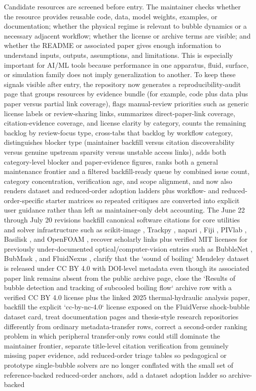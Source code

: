 \documentclass[11pt]{article}
\begin{document}
Candidate resources are screened before entry. The maintainer checks whether the resource provides reusable code, data, model weights, examples, or documentation; whether the physical regime is relevant to bubble dynamics or a necessary adjacent workflow; whether the license or archive terms are visible; and whether the README or associated paper gives enough information to understand inputs, outputs, assumptions, and limitations. This is especially important for AI/ML tools because performance in one apparatus, fluid, surface, or simulation family does not imply generalization to another. To keep these signals visible after entry, the repository now generates a reproducibility-audit page that groups resources by evidence bundle (for example, code plus data plus paper versus partial link coverage), flags manual-review priorities such as generic license labels or review-sharing links, summarizes direct-paper-link coverage, citation-evidence coverage, and license clarity by category, counts the remaining backlog by review-focus type, cross-tabs that backlog by workflow category, distinguishes blocker type (maintainer backfill versus citation discoverability versus genuine upstream sparsity versus unstable access links), adds both category-level blocker and paper-evidence figures, ranks both a general maintenance frontier and a filtered backfill-ready queue by combined issue count, category concentration, verification age, and scope alignment, and now also renders dataset and reduced-order adoption ladders plus workflow- and reduced-order-specific starter matrices so repeated critiques are converted into explicit user guidance rather than left as maintainer-only debt accounting. The June 22 through July 20 revisions backfill canonical software citations for core utilities and solver infrastructure such as scikit-image \cite{vanderwalt2014scikitimage}, Trackpy \cite{allan2024trackpy}, napari \cite{sofroniew2024napari}, Fiji \cite{schindelin2012fiji}, PIVlab \cite{thielicke2021pivlab}, Basilisk \cite{popinet2009basilisk}, and OpenFOAM \cite{jasak2007openfoam}, recover scholarly links plus verified MIT licenses for previously under-documented optical/computer-vision entries such as BubbleNet \cite{zhai2022bubblenet}, BubMask \cite{kim2021bubmask}, and FluidNexus \cite{gao2025fluidnexus}, clarify that the `sound of boiling` Mendeley dataset is released under CC BY 4.0 with DOI-level metadata even though its associated paper link remains absent from the public archive page, close the `Results of bubble detection and tracking of subcooled boiling flow` archive row with a verified CC BY 4.0 license plus the linked 2025 thermal-hydraulic analysis paper, backfill the explicit `cc-by-nc-4.0` license exposed on the FluidVerse shock-bubble dataset card, treat documentation pages and thesis-style research repositories differently from ordinary metadata-transfer rows, correct a second-order ranking problem in which peripheral transfer-only rows could still dominate the maintainer frontier, separate title-level citation verification from genuinely missing paper evidence, add reduced-order triage tables so pedagogical or prototype single-bubble solvers are no longer conflated with the small set of reference-backed reduced-order anchors, add a dataset adoption ladder so archive-backed 
\end{document}
